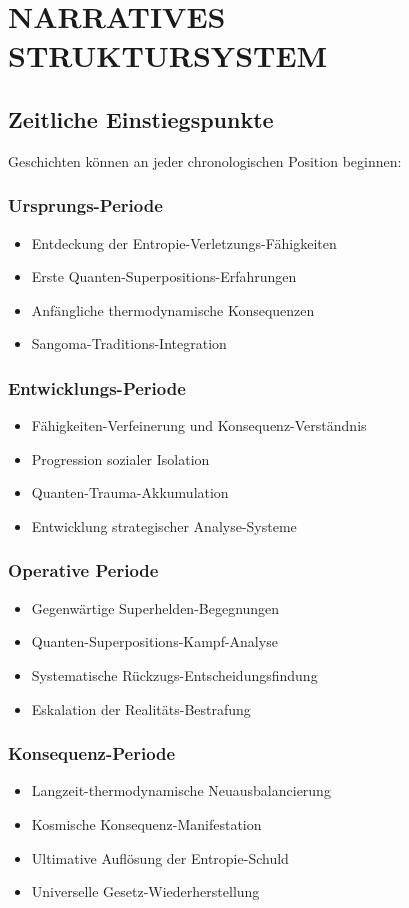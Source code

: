 \documentclass[12pt,a4paper]{article}
\begin{document}
\section{NARRATIVES STRUKTURSYSTEM}

\subsection{Zeitliche Einstiegspunkte}
Geschichten können an jeder chronologischen Position beginnen:

\subsubsection{Ursprungs-Periode}
\begin{itemize}
\item Entdeckung der Entropie-Verletzungs-Fähigkeiten
\item Erste Quanten-Superpositions-Erfahrungen
\item Anfängliche thermodynamische Konsequenzen
\item Sangoma-Traditions-Integration
\end{itemize}

\subsubsection{Entwicklungs-Periode}
\begin{itemize}
\item Fähigkeiten-Verfeinerung und Konsequenz-Verständnis
\item Progression sozialer Isolation
\item Quanten-Trauma-Akkumulation
\item Entwicklung strategischer Analyse-Systeme
\end{itemize}

\subsubsection{Operative Periode}
\begin{itemize}
\item Gegenwärtige Superhelden-Begegnungen
\item Quanten-Superpositions-Kampf-Analyse
\item Systematische Rückzugs-Entscheidungsfindung
\item Eskalation der Realitäts-Bestrafung
\end{itemize}

\subsubsection{Konsequenz-Periode}
\begin{itemize}
\item Langzeit-thermodynamische Neuausbalancierung
\item Kosmische Konsequenz-Manifestation
\item Ultimative Auflösung der Entropie-Schuld
\item Universelle Gesetz-Wiederherstellung
\end{itemize}
\end{document}
